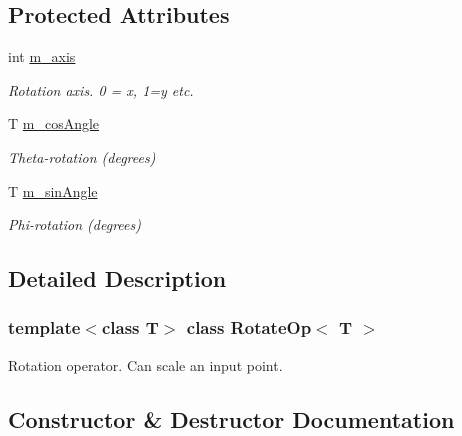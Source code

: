 \subsection*{Protected Attributes}
\begin{DoxyCompactItemize}
\item 
\mbox{\label{classRotateOp_ae0f4b6879b2b86506b4a528d7e627255}} 
int \hyperlink{classRotateOp_ae0f4b6879b2b86506b4a528d7e627255}{m\+\_\+axis}
\begin{DoxyCompactList}\small\item\em Rotation axis. 0 = x, 1=y etc. \end{DoxyCompactList}\item 
\mbox{\label{classRotateOp_a8eed86f336946618f1964056405b9ac4}} 
T \hyperlink{classRotateOp_a8eed86f336946618f1964056405b9ac4}{m\+\_\+cos\+Angle}
\begin{DoxyCompactList}\small\item\em Theta-\/rotation (degrees) \end{DoxyCompactList}\item 
\mbox{\label{classRotateOp_ab0f3316357239d07fb1da64b7298d53f}} 
T \hyperlink{classRotateOp_ab0f3316357239d07fb1da64b7298d53f}{m\+\_\+sin\+Angle}
\begin{DoxyCompactList}\small\item\em Phi-\/rotation (degrees) \end{DoxyCompactList}\end{DoxyCompactItemize}


\subsection{Detailed Description}
\subsubsection*{template$<$class T$>$\newline
class Rotate\+Op$<$ T $>$}

Rotation operator. Can scale an input point. 

\subsection{Constructor \& Destructor Documentation}
\mbox{\label{classRotateOp_a018f0a465bfaf271958ac975eb24b5bb}} 
